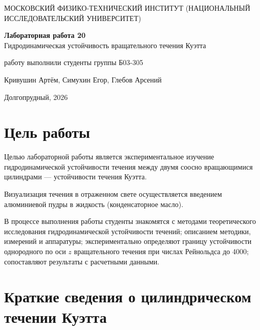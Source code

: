 \documentclass[12pt,a4paper]{article}
\begin{document}
\begin{titlepage}
    \begin{center}
		{\large МОСКОВСКИЙ ФИЗИКО-ТЕХНИЧЕСКИЙ ИНСТИТУТ (НАЦИОНАЛЬНЫЙ ИССЛЕДОВАТЕЛЬСКИЙ УНИВЕРСИТЕТ)}
	\end{center}
	\begin{center}



        \vspace{6cm}
        {\huge
		\begin{center}
			{\bf Лабораторная работа 20}\\
             Гидродинамическая устойчивость вращательного течения Куэтта 
		\end{center}
	}
	
		
		\vspace{10cm}
	\begin{flushright}
	   {\large работу выполнили студенты группы Б03-305}\par
	   \vspace{0.3cm}
	   {\LARGE Кривушин Артём, Симухин Егор, Глебов Арсений}
    \end{flushright}
	   \vspace{2cm}
	   \begin{center}
		  Долгопрудный, 2026
	   \end{center}
    	   \end{center}
\end{titlepage}

\section{Цель работы}

Целью лабораторной работы является экспериментальное изучение гидродинамической устойчивости течения между двумя соосно вращающимися цилиндрами — устойчивости течения Куэтта.

Визуализация течения в отраженном свете осуществляется введением алюминиевой пудры в жидкость (конденсаторное масло).

В процессе выполнения работы студенты знакомятся с методами теоретического исследования гидродинамической устойчивости течений; описанием методики, измерений и аппаратуры; экспериментально определяют границу устойчивости однородного по оси $z$ вращательного течения при числах Рейнольдса до 4000; сопоставляют результаты с расчетными данными.


\section{Краткие сведения о цилиндрическом течении Куэтта}
\end{document}
